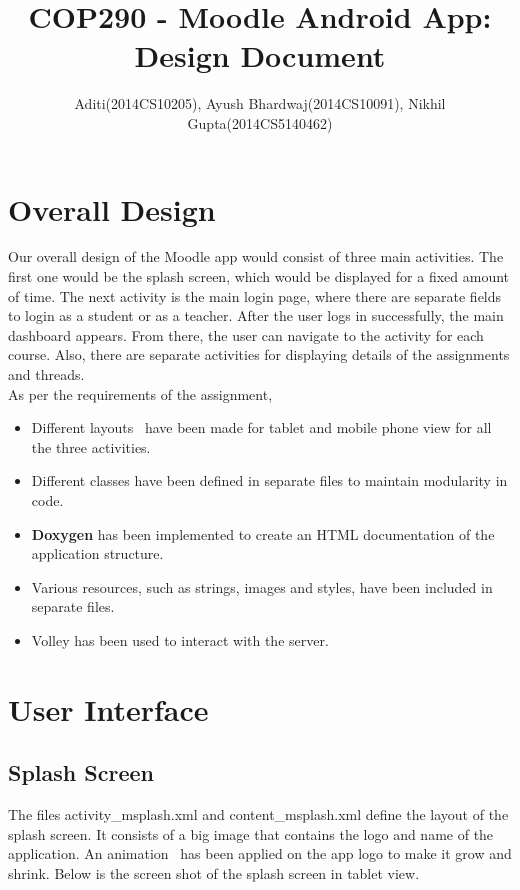 \documentclass{article}
\begin{document}
\title{COP290 - Moodle Android App: Design Document}
\author{ Aditi(2014CS10205), Ayush Bhardwaj(2014CS10091), Nikhil Gupta(2014CS5140462)}

\maketitle

\section{Overall Design}

Our overall design of the Moodle app would consist of three main activities. The first one would be the splash screen, which would be displayed for a fixed amount of time. The next activity is the main login page, where there are separate fields to login as a student or as a teacher. After the user logs in successfully, the main dashboard appears. From there, the user can navigate to the activity for each course. Also, there are separate activities for displaying details of the assignments and threads.\\
As per the requirements of the assignment,
\begin{itemize}
\item Different layouts~\cite{multiple_screen_sizes} have been made for tablet and mobile phone view for all the three activities.
\item Different classes have been defined in separate files to maintain modularity in code.
\item \textbf{Doxygen} has been implemented to create an HTML documentation of the application structure.
\item Various resources, such as strings, images and styles, have been included in separate files.
\item Volley has been used to interact with the server.
\end{itemize} 

\section{User Interface}
\subsection{Splash Screen} The files activity\_msplash.xml and content\_msplash.xml define the layout of the splash screen. It consists of a big image that contains the logo and name of the application. An animation~\cite{animations} has been applied on the app logo to make it grow and shrink. Below is the screen shot of the splash screen in tablet view. 
\end{document}

